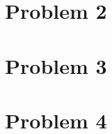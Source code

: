 \documentclass{article}
\begin{document}
    \section{Problem 2}
    \section{Problem 3}
    \section{Problem 4}
\end{document}
